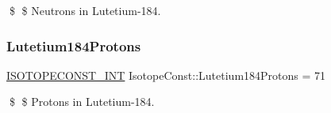 \$ \$ Neutrons in Lutetium-\/184. \mbox{\label{group___isotope_const-_lutetium-_lu184_gaf64d6a6e9abbe8d348f0675df181e5d4}} 
\subsubsection{\texorpdfstring{Lutetium184\+Protons}{Lutetium184Protons}}
{\footnotesize\ttfamily \mbox{\hyperlink{group___isotope_const-_macros_ga5f18360b3e99483a35c32d789e62621c}{I\+S\+O\+T\+O\+P\+E\+C\+O\+N\+S\+T\+\_\+\+I\+NT}} Isotope\+Const\+::\+Lutetium184\+Protons = 71}

\$ \$ Protons in Lutetium-\/184. 